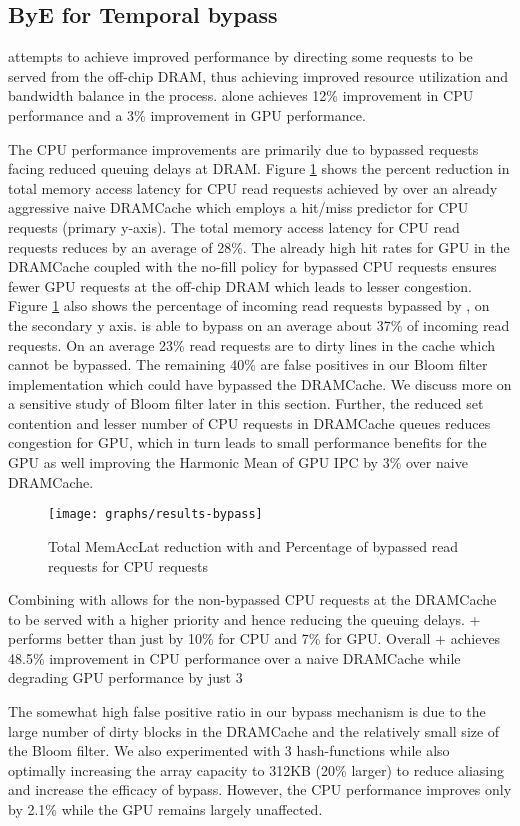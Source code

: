 \subsection{ByE for Temporal bypass}
\bypassname attempts to achieve improved performance by directing some requests to be served from the off-chip DRAM, thus achieving improved resource utilization and bandwidth balance in the process. \bypassname alone achieves 12\% improvement in CPU performance and a 3\% improvement in GPU performance. 
\par The CPU performance improvements are primarily due to bypassed requests facing reduced queuing delays at DRAM. Figure \ref{results-bloom} shows the percent reduction in total memory access latency for CPU read requests achieved by \bypassname over an already aggressive naive DRAMCache which employs a hit/miss predictor for CPU requests (primary y-axis). The total memory access latency for CPU read requests reduces by an average of 28\%. The already high hit rates for GPU in the DRAMCache coupled with the no-fill policy for bypassed CPU requests ensures fewer GPU requests at the off-chip DRAM which leads to lesser congestion. Figure \ref{results-bloom} also shows the percentage of incoming read requests bypassed by \bypassname, on the secondary y axis. 
\bypassname is able to bypass on an average about 37\% of incoming read requests. On an average 23\% read requests are to dirty lines in the cache which cannot be bypassed.  The remaining 40\% are false positives in our Bloom filter implementation which could have bypassed the DRAMCache. We discuss more on a sensitive study of Bloom filter later in this section. Further, the reduced set contention and lesser number of CPU requests in DRAMCache queues reduces congestion for GPU, which in turn leads to small performance benefits for the GPU as well improving the Harmonic Mean of GPU IPC by 3\% over naive DRAMCache.

\begin{figure}[!htb]
    \centering
    \texttt{[image: graphs/results-bypass]}
    \caption{Total MemAccLat reduction with \bypassname and Percentage of bypassed read requests for CPU requests}
    \label{results-bloom}
\end{figure}

\par Combining \prioname with \bypassname allows for the non-bypassed CPU requests at the DRAMCache to be served with a higher priority and hence reducing the queuing delays. \bypassname + \prioname performs better than just \prioname by 10\% for CPU and 7\% for GPU. Overall \bypassname + \prioname achieves 48.5\% improvement in CPU performance over a naive DRAMCache while degrading GPU performance by just 3%
\par The somewhat high false positive ratio in our bypass mechanism is due to the large number of dirty blocks in the DRAMCache and the relatively small size of the Bloom filter.  We also experimented with 3 hash-functions while also optimally increasing the array capacity to 312KB (20\% larger) to reduce aliasing and increase the efficacy of bypass. However, the CPU performance improves only by 2.1\% while the GPU remains largely unaffected.

